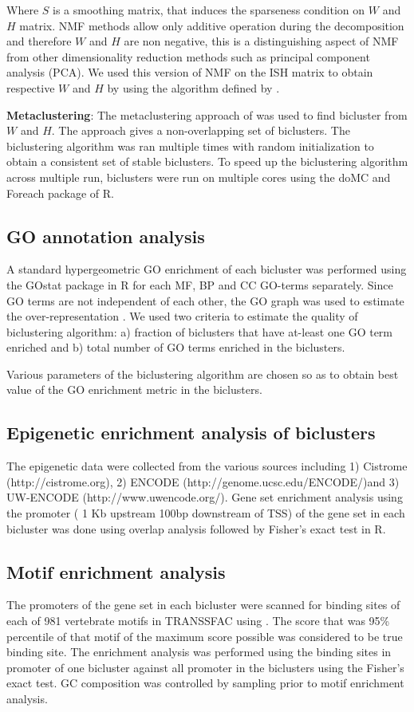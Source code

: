 \documentclass{article}
\begin{document}
Where $S$ is a smoothing matrix, that induces the sparseness condition on $W$ and $H$ matrix.
NMF methods allow only additive operation during the decomposition and therefore $W$ and $H$ are non negative,
this is a distinguishing aspect of NMF from other dimensionality reduction methods such as
principal component analysis (PCA). We used this version of NMF on the ISH matrix
to obtain respective $W$ and $H$ by using the algorithm defined by \cite{carmona2006biclustering}.  

\textbf{Metaclustering}: The metaclustering approach of \cite{badea2007stable} was used to 
find bicluster from $W$ and $H$.
The approach gives a non-overlapping set of biclusters. The biclustering algorithm was ran multiple times with random
initialization to obtain a consistent
set of stable biclusters. To speed up the biclustering algorithm across multiple run, biclusters were run on multiple 
cores using the doMC and Foreach package of R. 


\subsection{GO annotation analysis}
A standard hypergeometric GO enrichment of each bicluster was performed using the GOstat package in R for each  MF,
BP and CC GO-terms separately. 
Since GO terms are not independent of each other, the 
GO graph was used to estimate the over-representation \cite{alexa2006improved}. We used two
criteria to estimate the quality of biclustering algorithm: a) fraction of biclusters that have at-least one 
GO term enriched and b) total number of GO terms enriched in the biclusters.


Various parameters of the biclustering algorithm are chosen so as to obtain 
best value of the GO enrichment metric in the biclusters. 

\subsection{Epigenetic enrichment analysis of biclusters}
The epigenetic data were collected from the various sources including 1) Cistrome (http://cistrome.org), 2) ENCODE (http://genome.ucsc.edu/ENCODE/)and 3) UW-ENCODE (http://www.uwencode.org/).  Gene set enrichment analysis using the 
promoter ( 1 Kb upstream 100bp downstream of TSS)
of the gene set in each bicluster was done using overlap analysis followed by Fisher's exact test in R.

\subsection{Motif enrichment analysis}
The promoters of the gene set in each bicluster were scanned 
for binding sites of each of  981 vertebrate motifs in TRANSSFAC using \cite{hannenhalli2008eukaryotic}.
The score
that was 95\% percentile of that motif of the maximum score possible was considered to be true binding site. The
enrichment analysis was performed using the binding sites in promoter of one bicluster against all promoter in 
the biclusters using the Fisher's exact test. GC composition was controlled by sampling prior to motif enrichment 
analysis.

\end{document}
